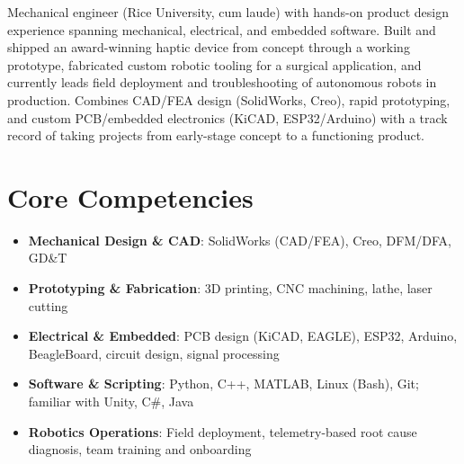 \documentclass[11pt,a4paper,sans]{moderncv}
\begin{document}
\makecvtitle


\vspace{6pt}
\small{Mechanical engineer (Rice University, cum laude) with hands-on product design experience spanning mechanical, electrical, and embedded software. Built and shipped an award-winning haptic device from concept through a working prototype, fabricated custom robotic tooling for a surgical application, and currently leads field deployment and troubleshooting of autonomous robots in production. Combines CAD/FEA design (SolidWorks, Creo), rapid prototyping, and custom PCB/embedded electronics (KiCAD, ESP32/Arduino) with a track record of taking projects from early-stage concept to a functioning product.}


\section{Core Competencies}
\vspace{1pt}
\begin{itemize}

\item \textbf{Mechanical Design \& CAD}: SolidWorks (CAD/FEA), Creo, DFM/DFA, GD\&T

\item \textbf{Prototyping \& Fabrication}: 3D printing, CNC machining, lathe, laser cutting

\item \textbf{Electrical \& Embedded}: PCB design (KiCAD, EAGLE), ESP32, Arduino, BeagleBoard, circuit design, signal processing

\item \textbf{Software \& Scripting}: Python, C++, MATLAB, Linux (Bash), Git; familiar with Unity, C\#, Java

\item \textbf{Robotics Operations}: Field deployment, telemetry-based root cause diagnosis, team training and onboarding

\end{itemize}

\end{document}
